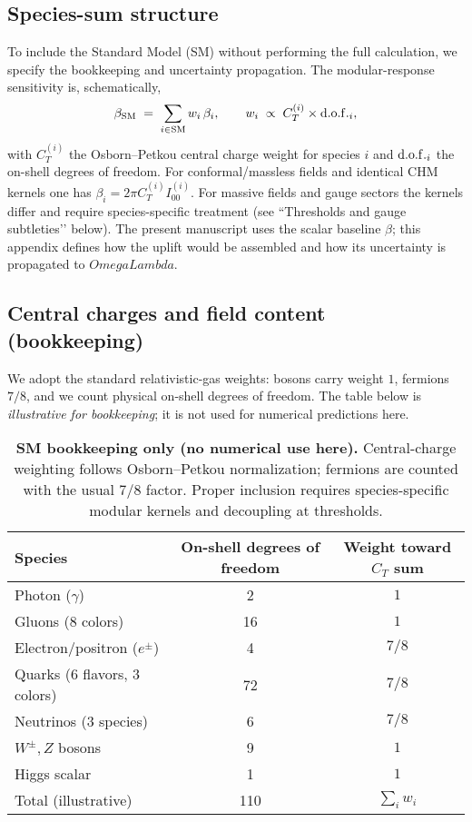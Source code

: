 \documentclass[aps,prd,onecolumn,superscriptaddress,nofootinbib]{revtex4-2}
\def\OmL{OmegaLambda}%
\newcommand{\OmL}{\Omega_\Lambda}
\begin{document}
\subsection{Species-sum structure}
To include the Standard Model (SM) without performing the full calculation, we specify the bookkeeping and uncertainty propagation. The modular-response sensitivity is, schematically,
\begin{equation}
\beta_{\rm SM} \;=\; \sum_{i\in{\rm SM}} w_i\, \beta_i,
\qquad
w_i \;\propto\; C_T^{(i)} \times {\rm d.o.f.}_i,
\end{equation}
with \(C_T^{(i)}\) the Osborn--Petkou central charge weight for species \(i\) and \({\rm d.o.f.}_i\) the on-shell degrees of freedom. For conformal/massless fields and identical CHM kernels one has \(\beta_i=2\pi C_T^{(i)} I_{00}^{(i)}\). For massive fields and gauge sectors the kernels differ and require species-specific treatment (see ``Thresholds and gauge subtleties’’ below). The present manuscript uses the scalar baseline \(\beta\); this appendix defines how the uplift would be assembled and how its uncertainty is propagated to \(\OmL\).

\subsection{Central charges and field content (bookkeeping)}
We adopt the standard relativistic-gas weights: bosons carry weight \(1\), fermions \(7/8\), and we count physical on-shell degrees of freedom. The table below is \emph{illustrative for bookkeeping}; it is not used for numerical predictions here.
\begin{table}[h]
\centering
\begin{tabular}{l c c}
\hline
Species & On-shell degrees of freedom & Weight toward \(C_T\) sum \\
\hline
Photon (\(\gamma\)) & 2 & \(1\) \\
Gluons (8 colors) & 16 & \(1\) \\
Electron/positron (\(e^\pm\)) & 4 & \(7/8\) \\
Quarks (6 flavors, 3 colors) & 72 & \(7/8\) \\
Neutrinos (3 species) & 6 & \(7/8\) \\
\(W^\pm, Z\) bosons & 9 & \(1\) \\
Higgs scalar & 1 & \(1\) \\
\hline
Total (illustrative) & 110 & \(\sum_i w_i\) \\
\hline
\end{tabular}
\caption{\textbf{SM bookkeeping only (no numerical use here).} Central-charge weighting follows Osborn--Petkou normalization; fermions are counted with the usual \(7/8\) factor. Proper inclusion requires species-specific modular kernels and decoupling at thresholds.}
\end{table}
\end{document}
